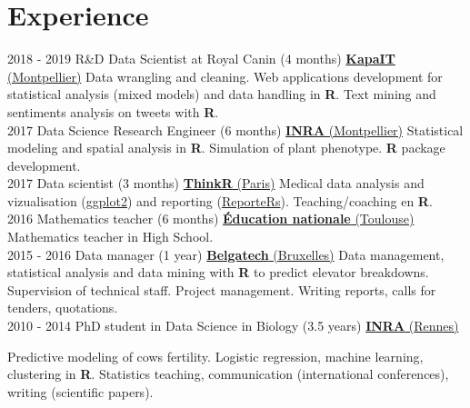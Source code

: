 \documentclass[letterpaper]{twentysecondcv} %
\begin{document}
\makeprofile %


\section{Experience}

\begin{twenty} %
\twentyitem
    	{2018 - 2019}
		{}
        {R\&D Data Scientist at Royal Canin \textnormal{(4 months)}}
        {\href{http://www.kapa-it.fr/}{\textbf{KapaIT} (Montpellier)}}
        {}
        {
        Data wrangling and cleaning. Web applications development for statistical analysis (mixed models) and data handling in \textbf{R}. Text mining and sentiments analysis on tweets with \textbf{R}.
        }
        \\
\twentyitem
    	{2017}
		{}
        {Data Science Research Engineer \textnormal{(6 months)}}
        {\href{https://www6.montpellier.inra.fr/mistea/}{\textbf{INRA} (Montpellier)}}
        {}
        {
        Statistical modeling and spatial analysis in \textbf{R}. 
        Simulation of plant phenotype. \textbf{R} package development.
        }
        \\
	\twentyitem
    	{2017}
		{}
        {Data scientist \textnormal{(3 months)}}
        {\href{https://thinkr.fr/}{\textbf{ThinkR} (Paris)}}
        {}
        {
        {
        Medical data analysis and vizualisation (\href{https://ggplot2.tidyverse.org/}{ggplot2}) and reporting
        (\href{https://davidgohel.github.io/ReporteRs/}{ReporteRs}). Teaching/coaching en \textbf{R}.
        }
        }
    \\   
    \twentyitem
   		{2016}
		{}
        {Mathematics teacher \textnormal{(6 months)}}
        {\href{http://www.ac-toulouse.fr/}{\textbf{Éducation nationale} (Toulouse)}}
        {}
        {
        Mathematics teacher in High School.
        }
     \\
     \twentyitem
   		{2015 - 2016}
		{}
        {Data manager \textnormal{(1 year)}}
        {\href{https://www.belgatech-engineering.com/}{\textbf{Belgatech} (Bruxelles)}}
        {}
        {
        Data management, statistical analysis and data mining with \textbf{R} to predict elevator breakdowns. 
        Supervision of technical staff. Project management. Writing reports, calls for tenders, quotations.
    	}
    	    \\   
    \twentyitem
   		{2010 - 2014}
		{}
        {PhD student in Data Science in Biology \textnormal{(3.5 years)}}
        {\href{https://www6.rennes.inra.fr/pegase}{\textbf{INRA} (Rennes)}}
        {}
        {Predictive modeling of cows fertility. Logistic regression, machine learning, clustering in \textbf{R}. Statistics teaching, communication (international conferences), writing (scientific papers).
    
}
\end{twenty}
\end{document}
